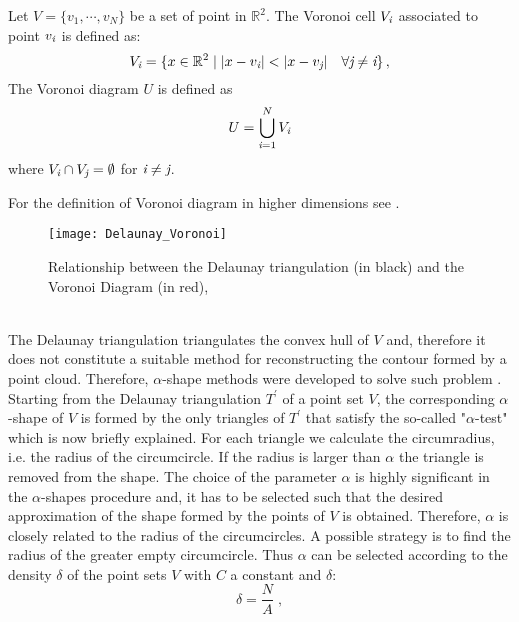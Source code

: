 \begin{defn}
Let $V=\{v_1,\cdots,v_N\}$ be a set of point in $\mathbb{R}^2$. The Voronoi cell $V_{\textit{i}}$ associated to point $v_{\textit{i}}$ is defined as:
\begin{equation}
V_\variabile{i}=\{x\in \mathbb{R}^2\; | \;|x-v_\variabile{i}|<|x-v_\variabile{j}| \quad \forall \variabile{j}\neq \variabile{i} \}\,,
\end{equation}
The Voronoi diagram $U$ is defined as 
\begin{equation}
U = \bigcup_{\textit{i}=1}^N V_{\textit{i}}
\end{equation}
 where $V_{\textit{i}}\cap V_{\textit{j}}= \emptyset$ for $\textit{i}\neq\textit{j}$.
\end{defn}
For the definition of Voronoi diagram in higher dimensions see \cite{brown1979voronoi}.
\begin{figure}[h]
\centering
\texttt{[image: Delaunay\_Voronoi]}
\caption{Relationship between the Delaunay triangulation (in black) and the Voronoi Diagram (in red), \cite{Wiki4}}
\label{fig:Voronoi}
\end{figure}
\\ \indent The Delaunay triangulation triangulates the convex hull of $V$ and, therefore it does not constitute a suitable method for reconstructing the contour formed by a point cloud. Therefore, $\alpha$-shape methods were developed to solve such problem \cite{edelsbrunner2010alpha, guo1997surface}. Starting from the Delaunay triangulation $T^\prime$ of a point set $V$, the corresponding $\alpha$-shape of $V$ is formed by the only triangles of $T^\prime$ that satisfy the so-called "$\alpha$-test" which is now briefly explained.
For each triangle we calculate the circumradius, i.e. the radius of the circumcircle. If the radius is larger than $\alpha$ the triangle is removed from the shape. The choice of the parameter $\alpha$ is highly significant in the $\alpha$-shapes procedure and, it has to be selected such that the desired approximation of the shape formed by the points of $V$ is obtained. 
Therefore, $\alpha$ is closely related to the radius of the circumcircles. A possible strategy is to find the radius of the greater empty circumcircle. Thus $\alpha$ can be selected according to the density $\delta$ of the point sets $V$
with $C$ a constant and $\delta$:
\begin{equation}
\delta=\frac{N}{A}\; ,
\end{equation}

